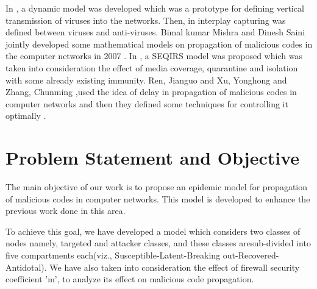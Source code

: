 In \cite{mishra2011}, a dynamic model was developed which was a prototype for defining vertical transmission of viruses into the networks. Then, in \cite{anupama2014} interplay capturing was defined between viruses and anti-viruses. Bimal kumar Mishra and Dinesh Saini jointly developed some mathematical models on propagation of malicious codes in the computer networks in 2007 \cite{mishra2mathematical,mishra2007mathematical}.
In \cite{sahu2015dynamics}, a SEQIRS model was proposed which was taken into consideration the effect of media coverage, quarantine and isolation with some already existing immunity. Ren, Jianguo and Xu, Yonghong and Zhang, Chunming ,used the idea of delay in propagation of malicious codes in computer networks and then they defined some techniques for controlling it optimally \cite{ren2013optimal}.




\section{Problem Statement and Objective}

The main objective of our work is to propose an epidemic model for propagation of malicious codes in computer networks. This model is developed to enhance the previous work done in this area.

To achieve this goal, we have developed a model which considers two classes of nodes namely, targeted and attacker classes, and these classes aresub-divided into five compartments each(viz., Susceptible-Latent-Breaking out-Recovered-Antidotal). We have also taken into consideration the effect of firewall security coefficient 'm', to analyze its effect on malicious code propagation.

